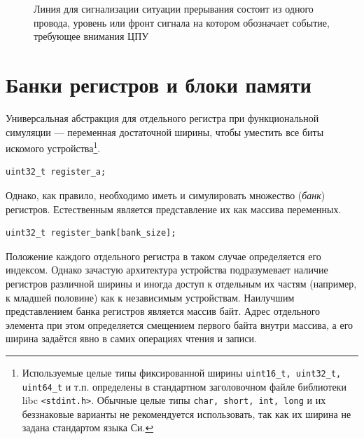 \begin{figure}[htb]
    \centering
    \caption[Линия прерывания]{Линия для сигнализации ситуации прерывания состоит из одного провода, уровень или фронт сигнала на котором обозначает событие, требующее внимания ЦПУ}
    \label{fig:interrupt-line}
\end{figure}


\section{Банки регистров и блоки памяти}

Универсальная абстракция для отдельного регистра при функциональной симуляции --- переменная достаточной ширины, чтобы уместить все биты искомого устройства\footnote{Используемые целые типы фиксированной ширины \texttt{uint16_t, uint32_t, uint64_t} и т.п. определены в стандартном заголовочном файле библиотеки libc \texttt{<stdint.h>}. Обычные целые типы \texttt{char, short, int, long} и их беззнаковые варианты не рекомендуется использовать, так как их ширина не задана стандартом языка Си.}.

\begin{lstlisting}
uint32_t register_a;
\end{lstlisting} 

Однако, как правило, необходимо иметь и симулировать множество (\textit{банк}) регистров. Естественным является представление их как массива переменных. 
\begin{lstlisting}
uint32_t register_bank[bank_size];
\end{lstlisting}

Положение каждого отдельного регистра в таком случае определяется его индексом. Однако зачастую архитектура устройства подразумевает наличие регистров различной ширины и иногда доступ к отдельным их частям (например, к младшей половине)  как к независимым устройствам. Наилучшим представлением банка регистров является массив байт. Адрес отдельного элемента при этом определяется смещением первого байта внутри массива, а его ширина задаётся явно в самих операциях чтения и записи.

